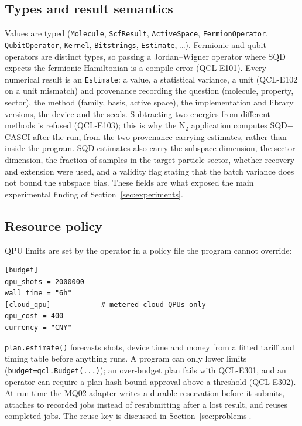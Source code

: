 \documentclass[10pt]{article}
\newcommand{\code}[1]{\texttt{#1}}
\begin{document}
\subsection{Types and result semantics}

Values are typed (\code{Molecule}, \code{ScfResult}, \code{ActiveSpace},
\code{FermionOperator}, \code{QubitOperator}, \code{Kernel}, \code{Bitstrings},
\code{Estimate}, \dots). Fermionic and qubit operators are distinct types, so passing a
Jordan--Wigner operator where SQD expects the fermionic Hamiltonian is a compile error
(QCL-E101). Every numerical result is an \code{Estimate}: a value, a statistical
variance, a unit (QCL-E102 on a unit mismatch) and provenance recording the question
(molecule, property, sector), the method (family, basis, active space), the
implementation and library versions, the device and the seeds. Subtracting two energies
from different methods is refused (QCL-E103); this is why the N$_2$ application computes
SQD$-$CASCI after the run, from the two provenance-carrying estimates, rather than inside
the program. SQD estimates also carry the subspace dimension, the sector dimension, the
fraction of samples in the target particle sector, whether recovery and extension were
used, and a validity flag stating that the batch variance does not bound the subspace
bias. These fields are what exposed the main experimental finding of
Section~\ref{sec:experiments}.

\subsection{Resource policy}

QPU limits are set by the operator in a policy file the program cannot override:
\begin{lstlisting}[language={}]
[budget]
qpu_shots = 2000000
wall_time = "6h"
[cloud_qpu]            # metered cloud QPUs only
qpu_cost = 400
currency = "CNY"
\end{lstlisting}
\code{plan.estimate()} forecasts shots, device time and money from a fitted tariff and
timing table before anything runs. A program can only lower limits
(\code{budget=qcl.Budget(...)}); an over-budget plan fails with QCL-E301, and an operator
can require a plan-hash-bound approval above a threshold (QCL-E302). At run time the
MQ02 adapter writes a durable reservation before it submits, attaches to recorded jobs
instead of resubmitting after a lost result, and reuses completed jobs. The reuse key is
discussed in Section~\ref{sec:problems}.
\end{document}
